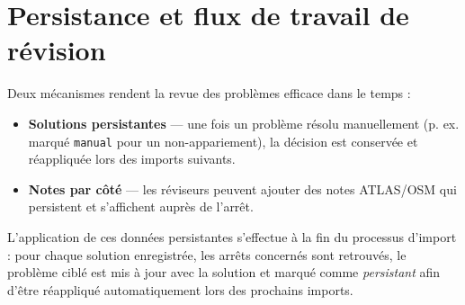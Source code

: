 \section{Persistance et flux de travail de révision}
\label{sec:persist-workflow}
Deux mécanismes rendent la revue des problèmes efficace dans le temps :
\begin{itemize}
  \item \textbf{Solutions persistantes} — une fois un problème résolu manuellement (p. ex. marqué \texttt{manual} pour un non-appariement), la décision est conservée et réappliquée lors des imports suivants.
  \item \textbf{Notes par côté} — les réviseurs peuvent ajouter des notes ATLAS/OSM qui persistent et s'affichent auprès de l'arrêt.
\end{itemize}

\noindent L'application de ces données persistantes s'effectue à la fin du processus d'import : pour chaque solution enregistrée, les arrêts concernés sont retrouvés, le problème ciblé est mis à jour avec la solution et marqué comme \emph{persistant} afin d'être réappliqué automatiquement lors des prochains imports.
